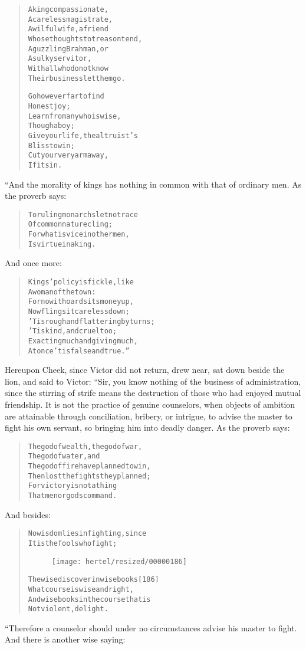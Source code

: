\documentclass[article, twoside, 10pt]{memoir}
\renewenvironment{verbatim}{%
\begin{quote}%
\vskip -10pt%
\begin{alltt}\normalfont\small}{\end{alltt}%
\end{quote}%
\vskip -10pt
} %
\begin{document}
\begin{verbatim}
A king compassionate,
A careless magistrate,
A wilful wife, a friend
Whose thoughts to treason tend,
A guzzling Brahman, or
A sulky servitor,
With all who do not know
Their business{\textemdash}let them go.

Go however far to find
    Honest joy;
Learn from any who is wise,
    Though a boy;
Give your life, the altruist's
    Bliss to win;
Cut your very arm away,
    If it sin.
\end{verbatim}
“And the morality of kings has nothing in common with that of
ordinary men. As the proverb says:

\begin{verbatim}
To ruling monarchs let no trace
    Of common nature cling;
For what is vice in other men,
    Is virtue in a king.
\end{verbatim}
And once more:

\begin{verbatim}
Kings' policy is fickle, like
    A woman of the town:
For now it hoards its money up,
    Now flings it careless down;
'Tis rough and flattering by turns;
    'Tis kind, and cruel too;
Exacting much and giving much,
    At once 'tis false and true.”
\end{verbatim}
Hereupon Cheek, since Victor did not return, drew near, sat down
beside the lion, and said to Victor: “Sir, you know nothing of the
business of administration, since the stirring of strife means the
destruction of those who had enjoyed mutual friendship. It is not
the practice of genuine counselors, when objects of ambition are
attainable through conciliation, bribery, or intrigue, to advise
the master to fight his own servant, so bringing him into deadly
danger. As the proverb says:

\begin{verbatim}
The god of wealth, the god of war,
    The god of water, and
The god of fire have planned to win,
    Then lost the fights they planned;
For victory is not a thing
    That men or gods command.
\end{verbatim}
And besides:

\begin{verbatim}
No wisdom lies in fighting, since
    It is the fools who fight;
\begin{figure}[p]\texttt{[image: hertel/resized/00000186]}\end{figure}The wise discover in wise books                         [186]
    What course is wise and right,
And wise books in the course that is
    Not violent, delight.
\end{verbatim}
“Therefore a counselor should under no circumstances advise his
master to fight. And there is another wise saying:
\end{document}

